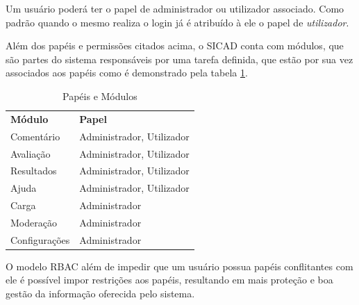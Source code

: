 \documentclass[12pt, a4paper]{report}
\begin{document}
Um usuário poderá ter o papel de administrador ou utilizador associado. Como padrão quando o mesmo realiza o login já é atribuído à ele o papel de \textit{utilizador}.

Além dos papéis e permissões citados acima, o \ac{SICAD} conta com módulos, que são partes do sistema responsáveis por uma tarefa definida, que estão por sua vez associados aos papéis como é demonstrado pela tabela  \ref{tab:papelmod}.

\begin{table}
 \centering
 {\renewcommand\arraystretch{1.25}
 
 \begin{tabular}{ l l }
  \cline{1-1}\cline{2-2}  
    \multicolumn{1}{|p{3.850cm}|}{\textbf{Módulo} \centering } &
    \multicolumn{1}{p{7.217cm}|}{\textbf{Papel} \centering }
  \\  
  \cline{1-1}\cline{2-2}  
    \multicolumn{1}{|p{3.850cm}|}{Comentário} &
    \multicolumn{1}{p{6.217cm}|}{Administrador, Utilizador}
  \\  
  \cline{1-1}\cline{2-2}  
    \multicolumn{1}{|p{3.850cm}|}{Avaliação} &
    \multicolumn{1}{p{6.217cm}|}{Administrador, Utilizador}
  \\  
    \cline{1-1}\cline{2-2}  
    \multicolumn{1}{|p{3.850cm}|}{Resultados} &
    \multicolumn{1}{p{6.217cm}|}{Administrador, Utilizador}
  \\  
    \cline{1-1}\cline{2-2}  
    \multicolumn{1}{|p{3.850cm}|}{Ajuda} &
    \multicolumn{1}{p{6.217cm}|}{Administrador, Utilizador}
  \\  
    \cline{1-1}\cline{2-2}  
    \multicolumn{1}{|p{3.850cm}|}{Carga} &
    \multicolumn{1}{p{6.217cm}|}{Administrador}
  \\  
    \cline{1-1}\cline{2-2}  
    \multicolumn{1}{|p{3.850cm}|}{Moderação} &
    \multicolumn{1}{p{6.217cm}|}{Administrador}
  \\  
    \cline{1-1}\cline{2-2}  
    \multicolumn{1}{|p{3.850cm}|}{Configurações} &
    \multicolumn{1}{p{6.217cm}|}{Administrador}
  \\  
  \hline
 \end{tabular} }
 \caption{Papéis e Módulos}
 \label{tab:papelmod}
\end{table}

O modelo \ac{RBAC} além de impedir que um usuário possua papéis conflitantes com ele é possível impor restrições aos papéis, resultando em mais proteção e boa gestão da informação oferecida pelo sistema.
\end{document}
